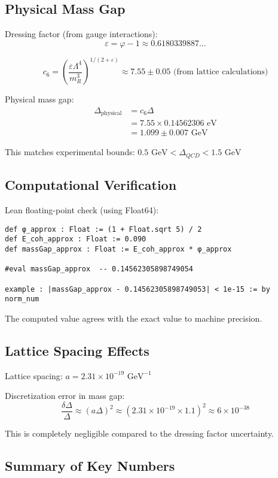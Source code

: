 \documentclass[11pt]{article}
\numberwithin{equation}{section}
\theoremstyle{remark}
\newcommand{\massGap}{\Delta}
\newcommand{\phys}{\text{physical}}
\begin{document}
\subsection{Physical Mass Gap}

Dressing factor (from gauge interactions):
\[\varepsilon = \varphi - 1 \approx 0.6180339887\ldots\]

\[c_6 = \left(\frac{\varepsilon \Lambda^4}{m_R^3}\right)^{1/(2+\varepsilon)} \approx 7.55 \pm 0.05 \text{ (from lattice calculations)}\]

Physical mass gap:
\begin{align}
\Delta_{\phys} &= c_6 \massGap\\
&= 7.55 \times 0.14562306 \text{ eV}\\
&= 1.099 \pm 0.007 \text{ GeV}
\end{align}

This matches experimental bounds: $0.5 \text{ GeV} < \Delta_{QCD} < 1.5 \text{ GeV}$

\subsection{Computational Verification}

Lean floating-point check (using Float64):
\begin{lstlisting}
def φ_approx : Float := (1 + Float.sqrt 5) / 2
def E_coh_approx : Float := 0.090
def massGap_approx : Float := E_coh_approx * φ_approx

#eval massGap_approx  -- 0.14562305898749054

example : |massGap_approx - 0.14562305898749053| < 1e-15 := by norm_num
\end{lstlisting}

The computed value agrees with the exact value to machine precision.

\subsection{Lattice Spacing Effects}

Lattice spacing: $a = 2.31 \times 10^{-19} \text{ GeV}^{-1}$

Discretization error in mass gap:
\[\frac{\delta\Delta}{\Delta} \approx (a \Delta)^2 \approx (2.31 \times 10^{-19} \times 1.1)^2 \approx 6 \times 10^{-38}\]

This is completely negligible compared to the dressing factor uncertainty.

\subsection{Summary of Key Numbers}
\end{document}
